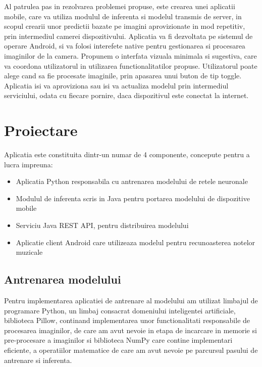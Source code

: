 	Al patrulea pas in rezolvarea problemei propuse, este crearea unei aplicatii mobile, care va utiliza modulul de inferenta si modelul transmis de server, in scopul crearii unor predictii bazate pe imagini aprovizionate in mod repetitiv, prin intermediul camerei dispozitivului.  
	Aplicatia va fi dezvoltata pe sistemul de operare Android, si va folosi interefete native pentru gestionarea si procesarea imaginilor de la camera. 
	Propunem o interfata vizuala minimala si sugestiva, care va coordona utilizatorul in utilizarea functionalitatilor propuse. Utilizatorul poate alege cand sa fie procesate imaginile, prin apasarea unui buton de tip toggle. 
	Aplicatia isi va aproviziona sau isi va actualiza modelul prin intermediul serviciului, odata cu fiecare pornire, daca dispozitivul este conectat la internet. 

	\section{Proiectare}
	
	Aplicatia este constituita dintr-un numar de 4 componente, concepute pentru a lucra impreuna: 
	
	\begin{itemize}	
	\item	Aplicatia Python responsabila cu  antrenarea modelului de retele neuronale
	\item	Modulul de inferenta scris in Java pentru portarea modelului de dispozitive mobile
	\item	Serviciu Java REST API, pentru distribuirea modelului
	\item	Aplicatie client Android care utilizeaza modelul pentru recunoasterea notelor muzicale
	\end{itemize}
	
	\subsection{Antrenarea modelului}
	
	Pentru implementarea aplicatiei de antrenare al modelului am utilizat limbajul de programare Python, un limbaj consacrat domeniului inteligentei artificiale, biblioteca Pillow, continand implementarea unor functionalitati responsabile de procesarea imaginilor, de care am avut nevoie in etapa de incarcare in memorie si pre-procesare a imaginilor si biblioteca NumPy care contine implementari eficiente, a operatiilor matematice de care am avut nevoie pe parcursul pasului de antrenare si inferenta. 
	

